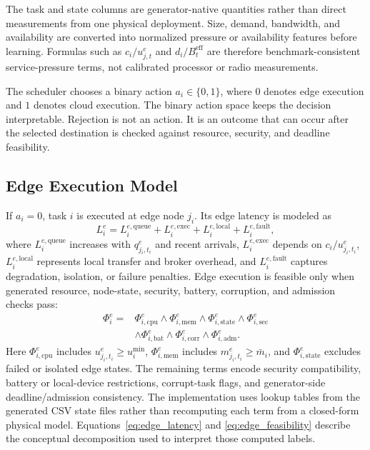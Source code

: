 The task and state columns are generator-native quantities rather than direct measurements from one physical deployment. Size, demand, bandwidth, and availability are converted into normalized pressure or availability features before learning. Formulas such as $c_i/u^e_{j,t}$ and $d_i/B^{\mathrm{eff}}_t$ are therefore benchmark-consistent service-pressure terms, not calibrated processor or radio measurements.

The scheduler chooses a binary action $a_i\in\{0,1\}$, where $0$ denotes edge execution and $1$ denotes cloud execution. The binary action space keeps the decision interpretable. Rejection is not an action. It is an outcome that can occur after the selected destination is checked against resource, security, and deadline feasibility.

\subsection{Edge Execution Model}

If $a_i=0$, task $i$ is executed at edge node $j_i$. Its edge latency is modeled as
\begin{equation}
L_i^{e} = L^{e,\mathrm{queue}}_{i} + L^{e,\mathrm{exec}}_{i} + L^{e,\mathrm{local}}_{i} + L^{e,\mathrm{fault}}_{i},
\label{eq:edge_latency}
\end{equation}
where $L^{e,\mathrm{queue}}_i$ increases with $q^e_{j_i,t_i}$ and recent arrivals, $L^{e,\mathrm{exec}}_i$ depends on $c_i/u^e_{j_i,t_i}$, $L^{e,\mathrm{local}}_i$ represents local transfer and broker overhead, and $L^{e,\mathrm{fault}}_i$ captures degradation, isolation, or failure penalties. Edge execution is feasible only when generated resource, node-state, security, battery, corruption, and admission checks pass:
\begin{equation}
\begin{aligned}
\Phi_i^e={}&
\Phi_{i,\mathrm{cpu}}^e
\land \Phi_{i,\mathrm{mem}}^e
\land \Phi_{i,\mathrm{state}}^e
\land \Phi_{i,\mathrm{sec}}^e \\
&\land \Phi_{i,\mathrm{bat}}^e
\land \Phi_{i,\mathrm{corr}}^e
\land \Phi_{i,\mathrm{adm}}^e .
\end{aligned}
\label{eq:edge_feasibility}
\end{equation}
Here $\Phi_{i,\mathrm{cpu}}^e$ includes $u^e_{j_i,t_i}\geq u_i^{\min}$, $\Phi_{i,\mathrm{mem}}^e$ includes $m^e_{j_i,t_i}\geq \bar{m}_i$, and $\Phi_{i,\mathrm{state}}^e$ excludes failed or isolated edge states. The remaining terms encode security compatibility, battery or local-device restrictions, corrupt-task flags, and generator-side deadline/admission consistency. The implementation uses lookup tables from the generated CSV state files rather than recomputing each term from a closed-form physical model. Equations~\eqref{eq:edge_latency} and \eqref{eq:edge_feasibility} describe the conceptual decomposition used to interpret those computed labels.

